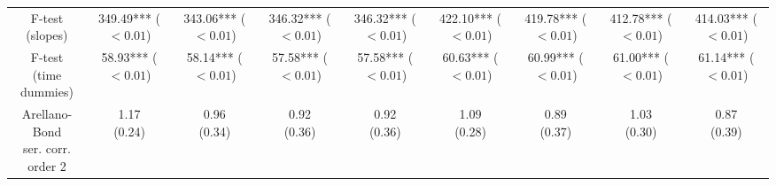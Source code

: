 \begin{tabular}{ccccccccc}
                   \makecell{F-test\\(slopes)} &  \makecell{349.49***\\($< 0.01$)} &  \makecell{343.06***\\($< 0.01$)} &  \makecell{346.32***\\($< 0.01$)} &  \makecell{346.32***\\($< 0.01$)} &  \makecell{422.10***\\($< 0.01$)} &  \makecell{419.78***\\($< 0.01$)} &  \makecell{412.78***\\($< 0.01$)} &  \makecell{414.03***\\($< 0.01$)} \\
             \makecell{F-test\\(time dummies)} &   \makecell{58.93***\\($< 0.01$)} &   \makecell{58.14***\\($< 0.01$)} &   \makecell{57.58***\\($< 0.01$)} &   \makecell{57.58***\\($< 0.01$)} &   \makecell{60.63***\\($< 0.01$)} &   \makecell{60.99***\\($< 0.01$)} &   \makecell{61.00***\\($< 0.01$)} &   \makecell{61.14***\\($< 0.01$)} \\
 \makecell{Arellano-Bond\\ser. corr.  order 2} &           \makecell{1.17\\(0.24)} &           \makecell{0.96\\(0.34)} &           \makecell{0.92\\(0.36)} &           \makecell{0.92\\(0.36)} &           \makecell{1.09\\(0.28)} &           \makecell{0.89\\(0.37)} &           \makecell{1.03\\(0.30)} &           \makecell{0.87\\(0.39)} \\
\bottomrule
\end{tabular}
